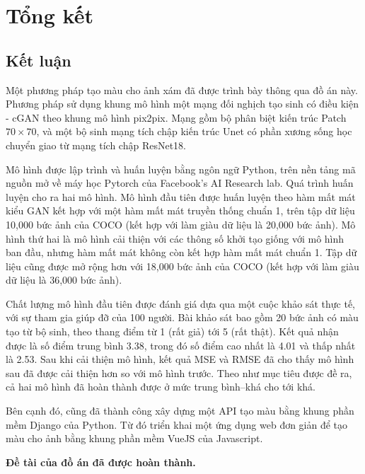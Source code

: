 \documentclass[a4paper, 12pt]{report}
\begin{document}
\chapter{Tổng kết}

\section{Kết luận}

Một phương pháp tạo màu cho ảnh xám đã được trình bày thông qua đồ án này.
Phương pháp sử dụng khung mô hình một mạng đối nghịch tạo sinh có điều kiện - cGAN theo khung mô hình pix2pix.
Mạng gồm bộ phân biệt kiến trúc Patch $70 \times 70$, và một bộ sinh mạng tích chập kiến trúc Unet có phần xương sống học chuyển giao từ mạng tích chập ResNet18.\vspace{5pt}

Mô hình được lập trình và huấn luyện bằng ngôn ngữ Python, trên nền tảng mã nguồn mở về máy học Pytorch của Facebook's AI Research lab.
Quá trình huấn luyện cho ra hai mô hình.
Mô hình đầu tiên được huấn luyện theo hàm mất mát kiểu GAN kết hợp với một hàm mất mát truyền thống chuẩn 1, trên tập dữ liệu 10,000 bức ảnh của COCO (kết hợp với làm giàu dữ liệu là 20,000 bức ảnh).
Mô hình thứ hai là mô hình cải thiện với các thông số khởi tạo giống với mô hình ban đầu, nhưng hàm mất mát không còn kết hợp hàm mất mát chuẩn 1.
Tập dữ liệu cũng được mở rộng hơn với 18,000 bức ảnh của COCO (kết hợp với làm giàu dữ liệu là 36,000 bức ảnh).\vspace{5pt}

Chất lượng mô hình đầu tiên được đánh giá dựa qua một cuộc khảo sát thực tế, với sự tham gia giúp đỡ của 100 người.
Bài khảo sát bao gồm 20 bức ảnh có màu tạo từ bộ sinh, theo thang điểm từ 1 (rất giả) tới 5 (rất thật).
Kết quả nhận được là số điểm trung bình 3.38, trong đó số điểm cao nhất là 4.01 và thấp nhất là 2.53.
Sau khi cải thiện mô hình, kết quả MSE và RMSE đã cho thấy mô hình sau đã được cải thiện hơn so với mô hình trước.
Theo như mục tiêu được đề ra, cả hai mô hình đã hoàn thành được ở mức trung bình--khá cho tới khá.\vspace{5pt}

Bên cạnh đó, cũng đã thành công xây dựng một API tạo màu bằng khung phần mềm Django của Python.
Từ đó triển khai một ứng dụng web đơn giản để tạo màu cho ảnh bằng khung phần mềm VueJS của Javascript.\vspace{5pt}

\textbf{Đề tài của đồ án đã được hoàn thành.}
\end{document}
